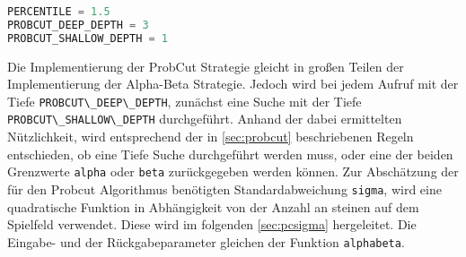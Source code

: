 \begin{lstlisting}[language=Python]
PERCENTILE = 1.5
PROBCUT_DEEP_DEPTH = 3
PROBCUT_SHALLOW_DEPTH = 1
\end{lstlisting}

Die Implementierung der ProbCut Strategie gleicht in großen Teilen der
Implementierung der Alpha-Beta Strategie. Jedoch wird bei jedem Aufruf
mit der Tiefe \passthrough{\lstinline!PROBCUT\_DEEP\_DEPTH!}, zunächst
eine Suche mit der Tiefe
\passthrough{\lstinline!PROBCUT\_SHALLOW\_DEPTH!} durchgeführt. Anhand
der dabei ermittelten Nützlichkeit, wird entsprechend der in
\autoref{sec:probcut} beschriebenen Regeln entschieden, ob eine Tiefe
Suche durchgeführt werden muss, oder eine der beiden Grenzwerte
\passthrough{\lstinline!alpha!} oder \passthrough{\lstinline!beta!}
zurückgegeben werden können. Zur Abschätzung der für den Probcut
Algorithmus benötigten Standardabweichung
\passthrough{\lstinline!sigma!}, wird eine quadratische Funktion in
Abhängigkeit von der Anzahl an steinen auf dem Spielfeld verwendet.
Diese wird im folgenden \autoref{sec:pcsigma} hergeleitet. Die Eingabe-
und der Rückgabeparameter gleichen der Funktion
\passthrough{\lstinline!alphabeta!}.

